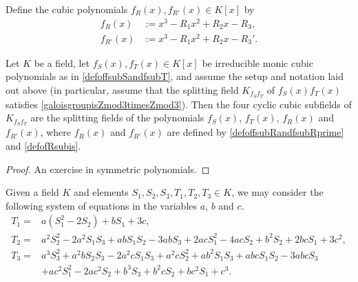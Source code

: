 Define the cubic polynomials $f_R(x), f_{R'}(x) \in K[x]$ by 
\begin{equation} \label{defoffsubRandfsubRprime}
\begin{split}
f_R(x) &:= x^3 - R_1x^2 + R_2x - R_3, \\
f_{R'}(x) &:= x^3 - R_1x^2 + R_2x - R_3'.
\end{split}
\end{equation}
\begin{lemma} \label{gettingattheothercubicfieldslemma}
Let $K$ be a field, let $f_S(x), f_T(x) \in K[x]$ be irreducible monic cubic polynomials as in \eqref{defoffsubSandfsubT}, and assume the setup and notation laid out above (in particular, assume that the splitting field $K_{f_Sf_T}$ of $f_S(x)f_T(x)$ satisfies \eqref{galoisgroupisZmod3timesZmod3}).  Then the four cyclic cubic subfields of $K_{f_Sf_T}$ are the splitting fields of the polynomials $f_S(x)$, $f_T(x)$, $f_R(x)$ and $f_{R'}(x)$, where $f_R(x)$ and $f_{R'}(x)$ are defined by \eqref{defoffsubRandfsubRprime} and \eqref{defofRsubis}.
\end{lemma}
\begin{proof}
An exercise in symmetric polynomials.
\end{proof}

Given a field $K$ and elements $S_1, S_2, S_3, T_1, T_2, T_3 \in K$, we may consider the following system of equations in the variables $a$, $b$ and $c$.
\begin{equation} \label{abcequations}
\begin{split}
T_1 = &a \left( S_1^2 - 2S_2 \right) + b S_1 + 3c, \\
T_2 = &a^2 S_2^2 - 2a^2 S_1 S_3 + ab S_1 S_2 - 3abS_3 + 2acS_1^2 - 4acS_2 + b^2 S_2 + 2bc S_1 + 3c^2, \\
T_3 = &a^3 S_3^2 + a^2b S_2 S_3 - 2a^2c S_1 S_3 + a^2c S_2^2 + ab^2 S_1 S_3 + abc S_1 S_2 - 3abc S_3 \\
&+ ac^2 S_1^2 - 2ac^2 S_2 + b^3 S_3 + b^2 c S_2 + bc^2 S_1 + c^3.
\end{split}
\end{equation}

